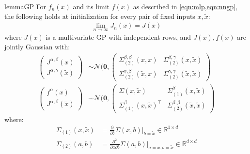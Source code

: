 \documentclass{article}
\theoremstyle{definition}
\theoremstyle{remark}
\renewcommand{\[}{\begin{eqnarray}}
\renewcommand{\]}{\end{eqnarray}}
\renewcommand{\[}{\begin{eqnarray}}
\renewcommand{\]}{\end{eqnarray}}
\newcommand{\R}{\mathbb{R}}
\begin{document}
\begin{restatable}{lemma}{GP}\label{lemma:GP}
For $f_n(x)$ and its limit $f(x)$ as described in \cref{eqn:mlp,eqn:nngp}, the following holds at initialization for every pair of fixed inputs $x,\tilde{x}$:
\[
\lim_{n \to \infty}J_n(x) = J(x) \label{eqn:jac}
\]
where $J(x)$ is a multivariate GP with independent rows, and $J(x),f(x)$ are jointly Gaussian 
with:
\begin{align}
\begin{pmatrix}\label{JJ:cov}
J^{\alpha,\beta}(x)\\
J^{\alpha,\gamma}(\tilde{x})
\end{pmatrix} &\sim \mathcal{N}(\bm{0}, \begin{pmatrix} \Sigma_{(2)}^{\beta,\beta}(x,x) & \Sigma_{(2)}^{\beta,\gamma}(x,\tilde{x})\\ \Sigma_{(2)}^{\gamma,\beta}(\tilde{x},x) & \Sigma_{(2)}^{\gamma,\gamma}(\tilde{x},\tilde{x}) \end{pmatrix}\\
\begin{pmatrix}\label{fJ:cov}
f^\alpha(x)\\
J^{\alpha,\beta}(\tilde{x})
\end{pmatrix} &\sim \mathcal{N}(\bm{0}, \begin{pmatrix} \Sigma(x,\tilde{x}) & \Sigma_{(1)}^{\beta}(x,\tilde{x})\\ \Sigma_{(1)}^\beta(x,\tilde{x})^\top & \Sigma_{(2)}^{\beta,\beta}(\tilde{x},\tilde{x}) \end{pmatrix}
\end{align}
where:
\begin{align}\label{sig1:sig2:def}
\Sigma_{(1)}(x,\tilde{x}) &= \frac{\partial}{\partial b}\Sigma(x,b)\Big|_{b=\tilde{x}} \in \R^{1\times d}\\
\Sigma_{(2)}(a,b) &= \frac{\partial^2}{\partial a\partial b}\Sigma(a,b)\Big|_{a=x,b=\tilde{x}} \in \R^{d \times d}
\end{align}
\end{restatable}
\end{document}
